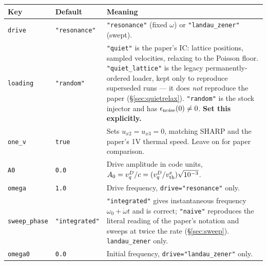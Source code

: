 \documentclass[11pt,a4paper]{article}
\newcommand{\code}[1]{\texttt{\small #1}}
\newcommand{\vth}{v_{\rm th}^{e}}
\begin{document}
\begin{center}\small
\begin{tabular}{@{}llp{7.4cm}@{}}
\toprule
Key & Default & Meaning \\
\midrule
\code{drive}        & \code{"resonance"} & \code{"resonance"} (fixed $\omega$) or
                                           \code{"landau\_zener"} (swept). \\
\code{loading}      & \code{"random"}    & \code{"quiet"} is the paper's IC:
                                           lattice positions, sampled velocities,
                                           relaxing to the Poisson floor.
                                           \code{"quiet\_lattice"} is the legacy
                                           permanently-ordered loader, kept only to
                                           reproduce superseded runs --- it does
                                           \emph{not} reproduce the paper
                                           (\S\ref{sec:quietrelax}).
                                           \code{"random"} is the stock injector and
                                           has $\epsilon_{\rm noise}(0)\neq0$.
                                           \textbf{Set this explicitly.} \\
\code{one\_v}       & \code{true}        & Sets $u_{x2}=u_{x3}=0$, matching
                                           \textsc{SHARP} and the paper's 1V thermal
                                           speed. Leave on for paper comparison. \\
\code{A0}           & \code{0.0}         & Drive amplitude in code units,
                                           $A_0 = v_q^D/c = (v_q^D/\vth)\sqrt{10^{-3}}$. \\
\code{omega}        & \code{1.0}         & Drive frequency, \code{drive="resonance"} only. \\
\code{sweep\_phase} & \code{"integrated"} & \code{"integrated"} gives instantaneous
                                           frequency $\omega_0+\dot\omega t$ and is
                                           correct; \code{"naive"} reproduces the
                                           literal reading of the paper's notation
                                           and sweeps at twice the rate
                                           (\S\ref{sec:sweep}). \code{landau\_zener}
                                           only. \\
\code{omega0}       & \code{0.0}         & Initial frequency, \code{drive="landau\_zener"} only. \\

\end{tabular}
\end{center}
\end{document}
